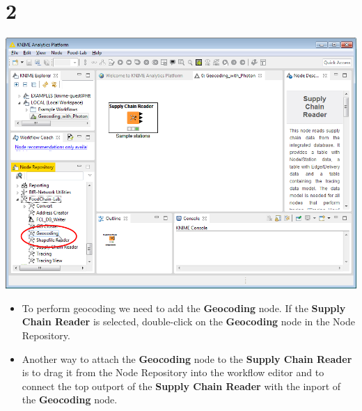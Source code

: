 \documentclass[10pt]{beamer}
\begin{document}
\section{2}
\begin{frame}
	\begin{center}
  		\includegraphics[height=0.6\textheight]{2.png}
	\end{center}
	\begin{itemize}
    \item To perform geocoding we need to add the \textbf{Geocoding} node. If the \textbf{Supply Chain Reader} is selected, double-click on the \textbf{Geocoding} node in the Node Repository.
    \item Another way to attach the \textbf{Geocoding} node to the \textbf{Supply Chain Reader} is to drag it from the Node Repository into the workflow editor and to connect the top outport of the \textbf{Supply Chain Reader} with the inport of the \textbf{Geocoding} node.
	\end{itemize}
\end{frame}
\end{document}
